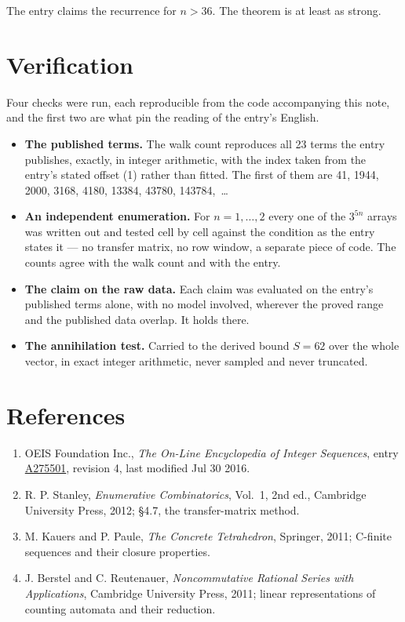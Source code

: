 \documentclass[11pt]{article}
\theoremstyle{definition}
\begin{document}
The entry claims the recurrence for $n > 36$. The theorem is at least as strong.

\section{Verification}

Four checks were run, each reproducible from the code accompanying this note, and the first two are what pin the reading of the entry's English.

\begin{itemize}

\item {\bfseries The published terms.} The walk count reproduces all 23 terms the entry publishes, exactly, in integer arithmetic, with the index taken from the entry's stated offset (1) rather than fitted. The first of them are 41, 1944, 2000, 3168, 4180, 13384, 43780, 143784,~\dots

\item {\bfseries An independent enumeration.} For $n = 1,\dots,2$ every one of the $3^{5n}$ arrays was written out and tested cell by cell against the condition as the entry states it --- no transfer matrix, no row window, a separate piece of code. The counts agree with the walk count and with the entry.

\item {\bfseries The claim on the raw data.} Each claim was evaluated on the entry's published terms alone, with no model involved, wherever the proved range and the published data overlap. It holds there.

\item {\bfseries The annihilation test.} Carried to the derived bound $S = 62$ over the whole vector, in exact integer arithmetic, never sampled and never truncated.

\end{itemize}

\section{References}

\begin{enumerate}

\item OEIS Foundation Inc., \emph{The On-Line Encyclopedia of Integer Sequences}, entry \href{https://oeis.org/A275501}{A275501}, revision 4, last modified Jul 30 2016.

\item R. P. Stanley, \emph{Enumerative Combinatorics}, Vol.~1, 2nd ed., Cambridge University Press, 2012; \S4.7, the transfer-matrix method.

\item M. Kauers and P. Paule, \emph{The Concrete Tetrahedron}, Springer, 2011; C-finite sequences and their closure properties.

\item J. Berstel and C. Reutenauer, \emph{Noncommutative Rational Series with Applications}, Cambridge University Press, 2011; linear representations of counting automata and their reduction.

\end{enumerate}
\end{document}
